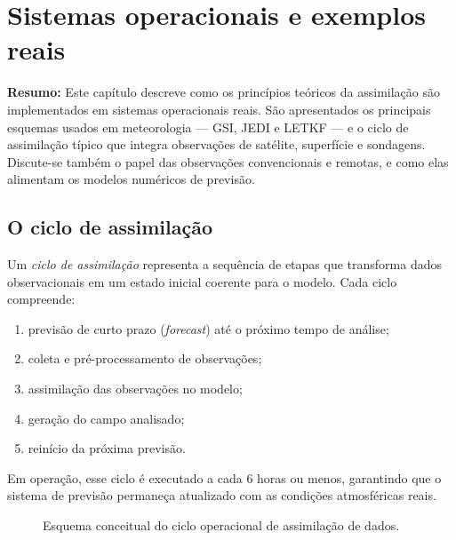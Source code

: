 \chapter{Sistemas operacionais e exemplos reais}
\label{ch:sistemas-operacionais}

\noindent\textbf{Resumo:}
Este capítulo descreve como os princípios teóricos da assimilação são implementados em sistemas operacionais reais.
São apresentados os principais esquemas usados em meteorologia — GSI, JEDI e LETKF — e o ciclo de assimilação típico que integra observações de satélite, superfície e sondagens.
Discute-se também o papel das observações convencionais e remotas, e como elas alimentam os modelos numéricos de previsão.

\section{O ciclo de assimilação}
Um \emph{ciclo de assimilação} representa a sequência de etapas que transforma dados observacionais em um estado inicial coerente para o modelo.
Cada ciclo compreende:
\begin{enumerate}
  \item previsão de curto prazo (\emph{forecast}) até o próximo tempo de análise;
  \item coleta e pré-processamento de observações;
  \item assimilação das observações no modelo;
  \item geração do campo analisado;
  \item reinício da próxima previsão.
\end{enumerate}
Em operação, esse ciclo é executado a cada 6 horas ou menos, garantindo que o sistema de previsão permaneça atualizado com as condições atmosféricas reais.

\begin{figure}[h!]
\centering
{}
\caption{Esquema conceitual do ciclo operacional de assimilação de dados.}
\label{fig:cycle}
\end{figure}

